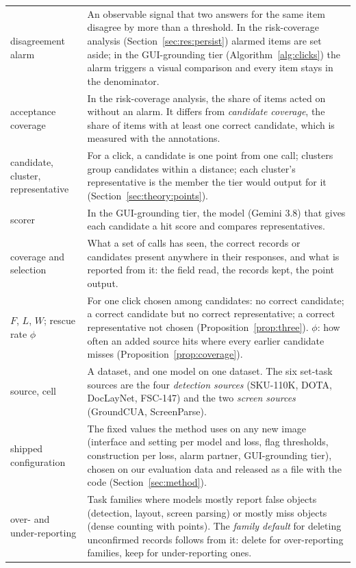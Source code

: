 \begin{table}[tp]
\begin{tabular}{@{}>{\raggedright\arraybackslash}p{2.6cm}>{\raggedright\arraybackslash}p{12.8cm}@{}}
disagreement alarm & An observable signal that two answers for the same item disagree by more than a threshold. In the risk-coverage analysis (Section~\ref{sec:res:persist}) alarmed items are set aside; in the GUI-grounding tier (Algorithm~\ref{alg:clicks}) the alarm triggers a visual comparison and every item stays in the denominator. \\
acceptance coverage & In the risk-coverage analysis, the share of items acted on without an alarm. It differs from \emph{candidate coverage}, the share of items with at least one correct candidate, which is measured with the annotations. \\
candidate, cluster, representative & For a click, a candidate is one point from one call; clusters group candidates within a distance; each cluster's representative is the member the tier would output for it (Section~\ref{sec:theory:points}). \\
scorer & In the GUI-grounding tier, the model (Gemini 3.8) that gives each candidate a hit score and compares representatives. \\
coverage and selection & What a set of calls has seen, the correct records or candidates present anywhere in their responses, and what is reported from it: the field read, the records kept, the point output. \\
$F$, $L$, $W$; rescue rate $\phi$ & For one click chosen among candidates: no correct candidate; a correct candidate but no correct representative; a correct representative not chosen (Proposition~\ref{prop:three}). $\phi$: how often an added source hits where every earlier candidate misses (Proposition~\ref{prop:coverage}). \\
source, cell & A dataset, and one model on one dataset. The six set-task sources are the four \emph{detection sources} (SKU-110K, DOTA, DocLayNet, FSC-147) and the two \emph{screen sources} (GroundCUA, ScreenParse). \\
shipped configuration & The fixed values the method uses on any new image (interface and setting per model and loss, flag thresholds, construction per loss, alarm partner, GUI-grounding tier), chosen on our evaluation data and released as a file with the code (Section~\ref{sec:method}). \\
over- and under-reporting & Task families where models mostly report false objects (detection, layout, screen parsing) or mostly miss objects (dense counting with points). The \emph{family default} for deleting unconfirmed records follows from it: delete for over-reporting families, keep for under-reporting ones. \\\bottomrule
\end{tabular}
\end{table}

